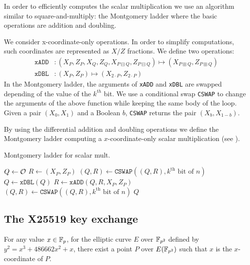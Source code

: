 In order to efficiently computes the scalar multiplication we use an algorithm
similar to square-and-multiply: the Montgomery ladder where the basic operations
are addition and doubling.

We consider x-coordinate-only operations. In order to simplify computations,
such coordinates are represented as $X/Z$ fractions. We define two operations:
\begin{align*}
\texttt{xADD} &: (X_P, Z_P, X_Q , Z_Q, X_{P \boxminus Q}, Z_{P \boxminus Q}) \mapsto (X_{P \boxplus Q}, Z_{P \boxplus Q})\\
\texttt{xDBL} &: (X_P, Z_P) \mapsto (X_{2 \cdot P}, Z_{2 \cdot P})
\end{align*}
In the Montgomery ladder, %
the arguments of \texttt{xADD} and \texttt{xDBL}
are swapped depending of the value of the $k^{th}$ bit. We use a conditional
swap \texttt{CSWAP} to change the arguments of the above function while keeping
the same body of the loop.
Given a pair $(X_0, X_1)$ and a Boolean $b$, \texttt{CSWAP} returns the pair
$(X_b, X_{1-b})$.

By using the differential addition and doubling operations we define the Montgomery ladder
computing a $x$-coordinate-only scalar multiplication (see ).
\begin{algorithm}
\caption{Montgomery ladder for scalar mult.}
\label{alg:montgomery-ladder}
\begin{algorithmic}
\STATE $Q \leftarrow \mathcal{O}$
\STATE $R \leftarrow (X_P,Z_P)$
  \STATE $(Q,R) \leftarrow \texttt{CSWAP}((Q,R), k^{\text{th}}\text{ bit of }n)$
  \STATE $Q \leftarrow \texttt{xDBL}(Q)$
  \STATE $R \leftarrow \texttt{xADD}(Q,R,X_P,Z_P)$
  \STATE $(Q,R) \leftarrow \texttt{CSWAP}((Q,R), k^{\text{th}}\text{ bit of }n)$
\ENDFOR
\RETURN $Q$
\end{algorithmic}
\end{algorithm}





\subsection{The X25519 key exchange}
\label{subsec:X25519-key-exchange}

For any value $x \in \mathbb{F}_{p}$, for the elliptic curve $E$ over $\mathbb{F}_{p^2}$
defined by $y^2 = x^3 + 486662 x^2 + x$, there exist a point $P$ over $E(\mathbb{F}_{p^2})$
such that $x$ is the $x$-coordinate of $P$.

